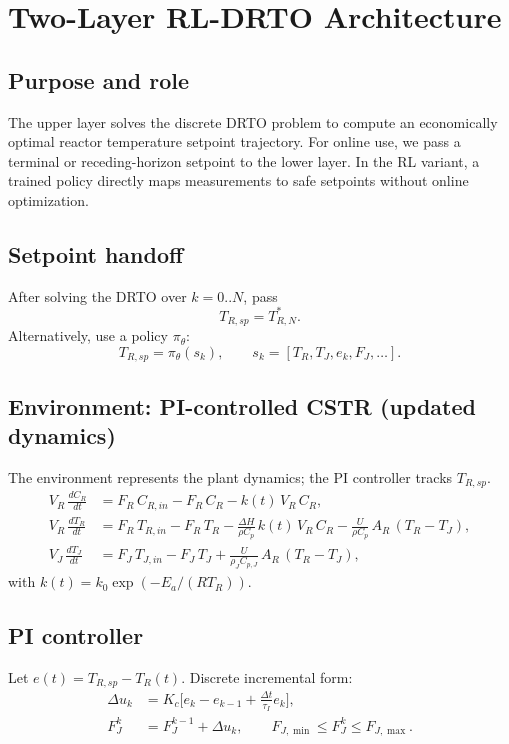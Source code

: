 \documentclass[11pt]{article}
\begin{document}
\section{Two-Layer RL-DRTO Architecture}
\subsection{Purpose and role}
The upper layer solves the discrete DRTO problem to compute an economically optimal reactor temperature setpoint trajectory. For online use, we pass a terminal or receding-horizon setpoint to the lower layer. In the RL variant, a trained policy directly maps measurements to safe setpoints without online optimization.

\subsection{Setpoint handoff}
After solving the DRTO over $k=0..N$, pass
\begin{equation}
    T_{R,sp} = T_{R,N}^{*}.
\end{equation}
Alternatively, use a policy $\pi_\theta$:
\begin{equation}
    T_{R,sp} = \pi_{\theta}(s_k), \qquad s_k = [T_R, T_J, e_k, F_J, \ldots].
\end{equation}

\subsection{Environment: PI-controlled CSTR (updated dynamics)}
The environment represents the plant dynamics; the PI controller tracks $T_{R,sp}$.
\begin{align}
V_R\,\frac{dC_R}{dt} &= F_R\,C_{R,in} - F_R\,C_R - k(t)\,V_R\,C_R, \\
V_R\,\frac{dT_R}{dt} &= F_R\,T_{R,in} - F_R\,T_R - \frac{\Delta H}{\rho C_p}\,k(t)\,V_R\,C_R - \frac{U}{\rho C_p}\,A_R\,(T_R - T_J), \\
V_J\,\frac{dT_J}{dt} &= F_J\,T_{J,in} - F_J\,T_J + \frac{U}{\rho_J C_{p,J}}\,A_R\,(T_R - T_J),
\end{align}
with $k(t) = k_0 \exp(-E_a/(R T_R))$.

\subsection{PI controller}
Let $e(t) = T_{R,sp} - T_R(t)$. Discrete incremental form:
\begin{align}
\Delta u_k &= K_c \Big[e_k - e_{k-1} + \frac{\Delta t}{\tau_I} e_k \Big], \\
F_J^k &= F_J^{k-1} + \Delta u_k, \qquad F_{J,\min} \le F_J^k \le F_{J,\max}.
\end{align}
\end{document}
